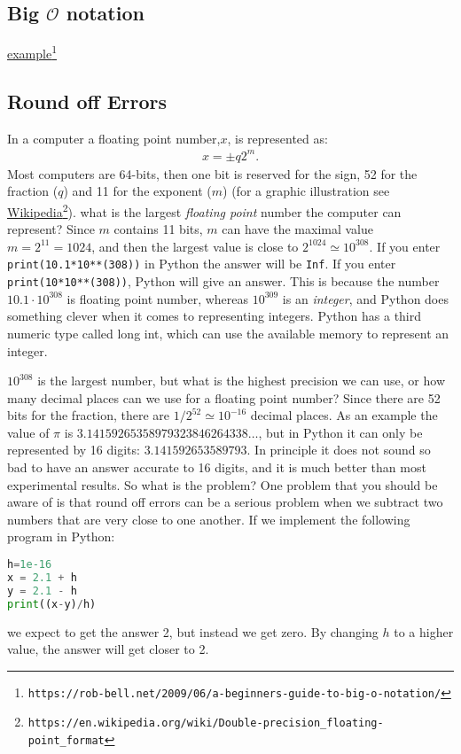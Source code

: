 \documentclass[graybox,sectrefs,envcountresetchap,open=right,final]{svmonodo}
\begin{document}
\subsection{Big $\mathcal{O}$ notation}
\href{{https://rob-bell.net/2009/06/a-beginners-guide-to-big-o-notation/}}{example}\footnote{\texttt{https://rob-bell.net/2009/06/a-beginners-guide-to-big-o-notation/}}

\subsection{Round off Errors}
In a computer a floating point number,$x$, is represented as:
\begin{align}
x=\pm q2^m.
\end{align}
Most computers are 64-bits, then one bit is reserved for the sign, 52 for the fraction ($q$) and 11 for
the exponent ($m$)  (for a graphic illustration see \href{{https://en.wikipedia.org/wiki/Double-precision_floating-point_format}}{Wikipedia}\footnote{\texttt{https://en.wikipedia.org/wiki/Double-precision\_floating-point\_format}}).
what is the largest \emph{floating point} number the computer can represent? 
Since $m$ contains 11 bits, $m$ can have the maximal value $m=2^{11}=1024$, and then the largest value is close to $2^{1024}\simeq 10^{308}$.
If you enter \texttt{print(10.1*10**(308))} in Python the answer will be \texttt{Inf}. If you enter \texttt{print(10*10**(308))}, Python will give an answer. This is because 
the number $10.1\cdot10^{308}$ is floating point number, whereas $10^{309}$ is an \emph{integer}, and Python does something clever when it comes to representing integers. 
Python has a third numeric type called long int, which can use the available memory to represent an integer. 

$10^{308}$ is the largest number, but what is the highest precision we can use, or how many decimal places can we use for a floating point number? 
Since there are 52 bits for the fraction, there are $1/2^{52}\simeq10^{-16}$ decimal places. As an example
the value of $\pi$ is $3.14159265358979323846264338\ldots$, but in Python it can only be represented by 16 digits: $3.141592653589793$. In principle 
it does not sound so bad to have an answer accurate to 16 digits, and it is much better than most experimental results. 
So what is the problem? One problem that you should be aware of is that round off errors can be a serious problem when we subtract two numbers that 
are very close to one another. If we implement the following program in Python:
\begin{lstlisting}[language=Python,style=blue1]
h=1e-16
x = 2.1 + h
y = 2.1 - h
print((x-y)/h)
\end{lstlisting}
we expect to get the answer 2, but instead we get zero. By changing $h$ to a higher value, the answer will get closer to 2. 
\end{document}

